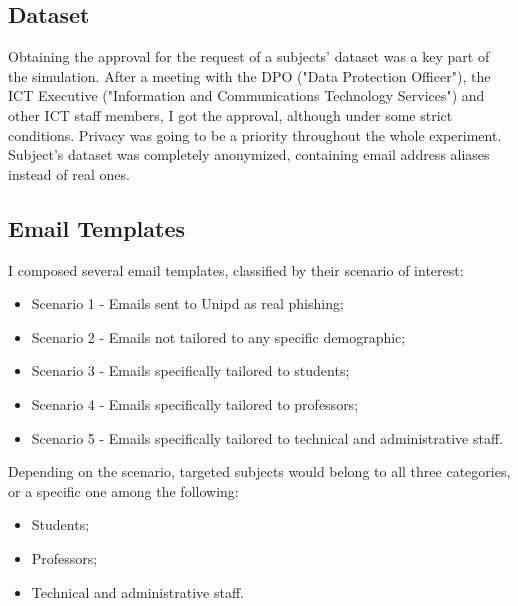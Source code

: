 \documentclass[a4paper]{article}
\begin{document}
\subsection{Dataset}

Obtaining the approval for the request of a subjects' dataset was a key part of the simulation. After a meeting with the DPO ("Data Protection Officer"), the ICT Executive ("Information and Communications Technology Services") and other ICT staff members, I got the approval, although under some strict conditions. Privacy was going to be a priority throughout the whole experiment. Subject's dataset was completely anonymized, containing email address aliases instead of real ones.

\subsection{Email Templates}

I composed several email templates, classified by their scenario of interest:

\begin{itemize}
    \item Scenario 1 - Emails sent to Unipd as real phishing;
    \item Scenario 2 - Emails not tailored to any specific demographic;
    \item Scenario 3 - Emails specifically tailored to students;
    \item Scenario 4 - Emails specifically tailored to professors;
    \item Scenario 5 - Emails specifically tailored to technical and administrative staff.
\end{itemize}

\noindent
Depending on the scenario, targeted subjects would belong to all three categories, or a specific one among the following:

\begin{itemize}
    \item Students;
    \item Professors;
    \item Technical and administrative staff.
\end{itemize}
\end{document}
